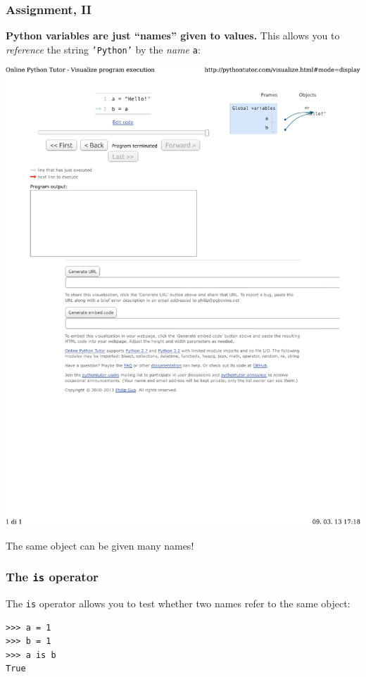 \documentclass[english,serif,mathserif,xcolor=pdftex,dvipsnames,table]{beamer}
\begin{document}
\begin{frame}[fragile]
  \frametitle{Assignment, II}

  \textbf{Python variables are just ``names'' given to values.}
  This allows you to \emph{reference} the string \texttt{'Python'}
  by the \emph{name} \texttt{a}:

  \+
  \includegraphics[width=1.2\linewidth,viewport=150 650 650 750,clip]{fig/a=b}

  \+
  The same object can be given many names!
\end{frame}


\begin{frame}[fragile]
  \frametitle{The \texttt{is} operator}

  The \texttt{is} operator allows you to test whether two names refer
  to the same object:
\begin{lstlisting}
>>> a = 1
>>> b = 1
>>> a is b
True
\end{lstlisting}

\end{frame}
\end{document}
